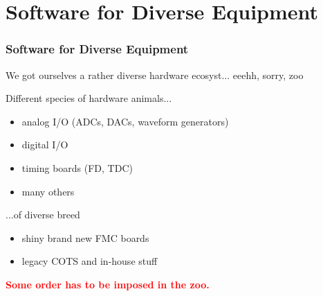 \documentclass[compress,red]{beamer}
\begin{document}

\section{Software for Diverse Equipment}

\begin{frame}
\frametitle{Software for Diverse Equipment}

We got ourselves a rather diverse hardware ecosyst...
\pause eeehh, sorry, \pause zoo
\pause
\begin{block}{Different species of hardware animals...}
\begin{itemize}
\pause\item analog I/O (ADCs, DACs, waveform generators)
\pause\item digital I/O
\pause\item timing boards (FD, TDC)
\pause\item many others
\end{itemize}
\end{block}
\pause
\begin{block}{...of diverse breed}
\begin{itemize}
\pause\item shiny brand new FMC boards
\pause\item legacy COTS and in-house stuff
\end{itemize}
\end{block}

\pause \textcolor{red}{\bf Some order has to be imposed in the zoo.}
\end{frame}
\end{document}
